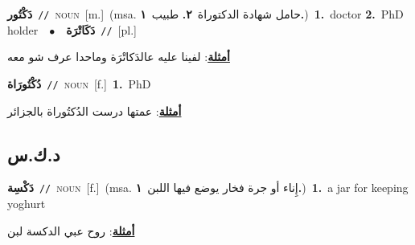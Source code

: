 \documentclass[10pt,a4paper,twoside]{article} %
\begin{document}
\begin{multicols}{2}
{\setlength\topsep{0pt}\textbf{\foreignlanguage{arabic}{دَكْتُور}}\ {\color{gray}\texttt{//}\color{black}}\ \textsc{noun}\ [m.]\ \color{gray}(msa. \foreignlanguage{arabic}{حامل شهادة الدكتوراة}~\foreignlanguage{arabic}{\textbf{٢.}}  \foreignlanguage{arabic}{طبيب}~\foreignlanguage{arabic}{\textbf{١.}})\color{black}\ \textbf{1.}~doctor  \textbf{2.}~PhD holder\ \ $\bullet$\ \ \setlength\topsep{0pt}\textbf{\foreignlanguage{arabic}{دَكَاتْرَة}}\ {\color{gray}\texttt{//}\color{black}}\ [pl.]\  \begin{flushright}\color{gray}\foreignlanguage{arabic}{\textbf{\underline{\foreignlanguage{arabic}{أمثلة}}}: لفينا عليه عالدَكاتْرَة وماحدا عرف شو معه}\end{flushright}\color{black}} \vspace{2mm}

{\setlength\topsep{0pt}\textbf{\foreignlanguage{arabic}{دُكْتُورَاة}}\ {\color{gray}\texttt{//}\color{black}}\ \textsc{noun}\ [f.]\ \textbf{1.}~PhD\  \begin{flushright}\color{gray}\foreignlanguage{arabic}{\textbf{\underline{\foreignlanguage{arabic}{أمثلة}}}: عمتها درست الدُكتُوراة بالجزائر}\end{flushright}\color{black}} \vspace{2mm}

\vspace{-3mm}
\subsection*{\color{blue}\foreignlanguage{arabic}{د.ك.س}\color{blue}{}} 

{\setlength\topsep{0pt}\textbf{\foreignlanguage{arabic}{دَكْسِة}}\ {\color{gray}\texttt{//}\color{black}}\ \textsc{noun}\ [f.]\ \color{gray}(msa. \foreignlanguage{arabic}{إِناء أو جرة فخار يوضع فيها اللبن}~\foreignlanguage{arabic}{\textbf{١.}})\color{black}\ \textbf{1.}~a jar for keeping yoghurt\  \begin{flushright}\color{gray}\foreignlanguage{arabic}{\textbf{\underline{\foreignlanguage{arabic}{أمثلة}}}: روح عبي الدكسة لبن}\end{flushright}\color{black}} \vspace{2mm}


\end{multicols}
\end{document}
